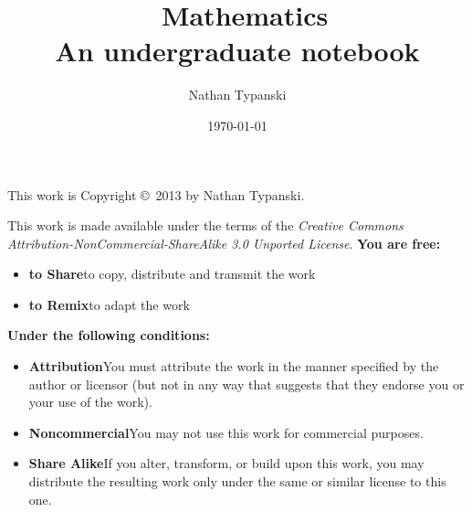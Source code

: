 \documentclass[fontsize=10pt,twoside,BCOR=12mm,DIV=calc]{scrbook}
\begin{document}


\title{\textbf{\
Mathematics
}\\An undergraduate notebook}
\author    {Nathan Typanski}
\date      {\today}
\maketitle

\newpage

\cleardoublepage

\newpage

\edef\marginnotetextwidth{\the\textwidth}

\begin{center}
This work is Copyright \copyright\ 2013 by Nathan Typanski.
\end{center}

This work is made available under the terms of the \emph{Creative Commons
    Attribution-NonCommercial-ShareAlike 3.0 Unported License}.
\textbf{You are free:}
\begin{itemize}
  \item[] \textbf{to Share}\dash{}to copy, distribute and transmit the work
  \item[] \textbf{to Remix}\dash{}to adapt the work
\end{itemize}

\textbf{Under the following conditions:}
\begin{itemize}
  \item[]\ccby\textbf{Attribution}\dash{}You must attribute the work in the manner
      specified by the author or licensor (but not in any way that suggests that
      they endorse you or your use of the work).
  \item[] \ccnc\textbf{Noncommercial}\dash{}You may not use this work for
      commercial purposes.
  \item[] \ccsa\textbf{Share Alike}\dash{}If you alter, transform, or build upon
      this work, you may distribute the resulting work only under the same or
      similar license to this one.
\end{itemize}
\end{document}
